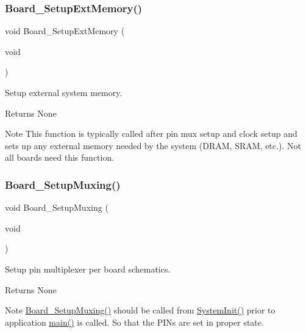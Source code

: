 \subsubsection{\texorpdfstring{Board\+\_\+\+Setup\+Ext\+Memory()}{Board\_SetupExtMemory()}}
{\footnotesize\ttfamily void Board\+\_\+\+Setup\+Ext\+Memory (\begin{DoxyParamCaption}\item[{void}]{ }\end{DoxyParamCaption})}



Setup external system memory. 

\begin{DoxyReturn}{Returns}
None 
\end{DoxyReturn}
\begin{DoxyNote}{Note}
This function is typically called after pin mux setup and clock setup and sets up any external memory needed by the system (D\+R\+AM, S\+R\+AM, etc.). Not all boards need this function. 
\end{DoxyNote}
\mbox{\label{group___b_o_a_r_d___c_o_m_m_o_n___a_p_i_ga8ac1dc465c66e1cc00f5ffd346904d97}} 
\subsubsection{\texorpdfstring{Board\+\_\+\+Setup\+Muxing()}{Board\_SetupMuxing()}}
{\footnotesize\ttfamily void Board\+\_\+\+Setup\+Muxing (\begin{DoxyParamCaption}\item[{void}]{ }\end{DoxyParamCaption})}



Setup pin multiplexer per board schematics. 

\begin{DoxyReturn}{Returns}
None 
\end{DoxyReturn}
\begin{DoxyNote}{Note}
\hyperlink{group___b_o_a_r_d___c_o_m_m_o_n___a_p_i_ga8ac1dc465c66e1cc00f5ffd346904d97}{Board\+\_\+\+Setup\+Muxing()} should be called from \hyperlink{armv7m__startup_8c_a93f514700ccf00d08dbdcff7f1224eb2}{System\+Init()} prior to application \hyperlink{group__samples_ga840291bc02cba5474a4cb46a9b9566fe}{main()} is called. So that the P\+I\+Ns are set in proper state. 
\end{DoxyNote}


